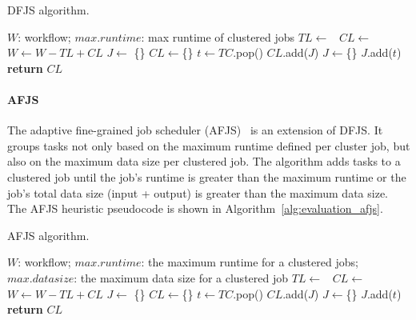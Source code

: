 \begin{algorithm}[!htb]
	\caption{ DFJS algorithm.}
	\footnotesize
	\label{alg:evaluation_dfjs}
	\begin{algorithmic}[1]
		\Require $W$: workflow; $max.runtime$: max runtime of clustered jobs 
				\State $TL\gets $\  
				\State $CL\gets$  \  
				\State $W \gets W - TL + CL$   
			\EndFor
		\EndProcedure
			\State $J\gets$ \{\}
			\State $CL\gets$\{\}
				\State $t \gets TC$.pop() 
				\State	$CL$.add($J$)
				\State	$J \gets$\{\}
				\EndIf	
				\State $J$.add($t$)
			\EndWhile
			\State \textbf{return} $CL$
		\EndProcedure
	\end{algorithmic}
\end{algorithm}


\paragraph{\textbf{AFJS}}
The adaptive fine-grained job scheduler (AFJS)~\cite{Liu2009} is an extension of DFJS. It groups tasks not only based on the maximum runtime defined per cluster job, but also on the maximum data size per clustered job. The algorithm adds tasks to a clustered job until the job's runtime is greater than the maximum runtime or the job's total data size (input + output) is greater than the maximum data size. The AFJS heuristic pseudocode is shown in Algorithm~\ref{alg:evaluation_afjs}. 

\begin{algorithm}[!htb]
	\caption{ AFJS algorithm.}
	\footnotesize
	\label{alg:evaluation_afjs}
	\begin{algorithmic}[1]
		\Require $W$: workflow; $max.runtime$: the maximum runtime for a clustered jobs; $max.datasize$: the maximum data size for a clustered job
				\State $TL\gets $\  
				\State $CL\gets$  \  
				\State $W \gets W - TL + CL$   
			\EndFor
		\EndProcedure
			\State $J\gets$ \{\}
			\State $CL\gets$\{\}
				\State $t \gets TC$.pop() 
				\State	$CL$.add($J$)
				\State	$J \gets$\{\}
				\EndIf	
				\State $J$.add($t$)
			\EndWhile
			\State \textbf{return} $CL$
		\EndProcedure
	\end{algorithmic}
\end{algorithm}

